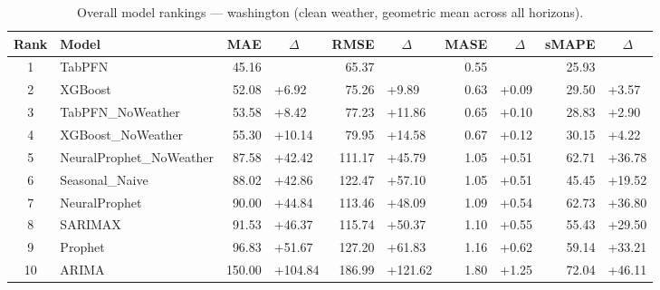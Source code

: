 \begin{table}[ht!]
\centering
\caption{Overall model rankings — washington (clean weather, geometric mean across all horizons).}
\label{tab:overall_rankings_washington}
{\small
\setlength{\tabcolsep}{3pt}
\scriptsize
\begin{tabular}{clrlrlrlrl}
\toprule
Rank & Model & MAE & ~~\(\Delta\) & RMSE & ~~\(\Delta\) & MASE & ~~\(\Delta\) & sMAPE & ~~\(\Delta\) \\
\midrule
1 & TabPFN & 45.16 &  & 65.37 &  & 0.55 &  & 25.93 &  \\
2 & XGBoost & 52.08 & +6.92 & 75.26 & +9.89 & 0.63 & +0.09 & 29.50 & +3.57 \\
3 & TabPFN\_NoWeather & 53.58 & +8.42 & 77.23 & +11.86 & 0.65 & +0.10 & 28.83 & +2.90 \\
4 & XGBoost\_NoWeather & 55.30 & +10.14 & 79.95 & +14.58 & 0.67 & +0.12 & 30.15 & +4.22 \\
5 & NeuralProphet\_NoWeather & 87.58 & +42.42 & 111.17 & +45.79 & 1.05 & +0.51 & 62.71 & +36.78 \\
6 & Seasonal\_Naive & 88.02 & +42.86 & 122.47 & +57.10 & 1.05 & +0.51 & 45.45 & +19.52 \\
7 & NeuralProphet & 90.00 & +44.84 & 113.46 & +48.09 & 1.09 & +0.54 & 62.73 & +36.80 \\
8 & SARIMAX & 91.53 & +46.37 & 115.74 & +50.37 & 1.10 & +0.55 & 55.43 & +29.50 \\
9 & Prophet & 96.83 & +51.67 & 127.20 & +61.83 & 1.16 & +0.62 & 59.14 & +33.21 \\
10 & ARIMA & 150.00 & +104.84 & 186.99 & +121.62 & 1.80 & +1.25 & 72.04 & +46.11 \\
\bottomrule
\end{tabular}
}
\end{table}
